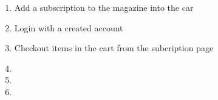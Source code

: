 \documentclass[11pt]{article}
\begin{document}
\begin{enumerate}
\begin{enumerate}
			\end{enumerate}
		\item Add a subscription to the magazine into the car
		\item Login with a created account
		\item Checkout items in the cart from the subcription page
		\item 
		\item 
		\item 
	\end{enumerate}
\end{document}
